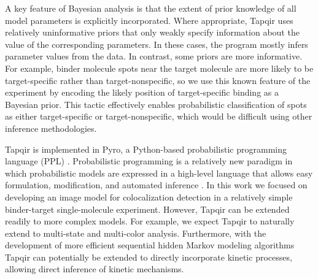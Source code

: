 A key feature of Bayesian analysis is that the extent of prior knowledge of all model parameters is explicitly incorporated. Where appropriate, Tapqir uses relatively uninformative priors that only weakly specify information about the value of the corresponding parameters.  In these cases, the program mostly infers parameter values from the data.  In contrast, some priors are more informative.  For example, binder molecule spots near the target molecule are more likely to be target-specific rather than target-nonspecific, so we use this known feature of the experiment by encoding the likely position of target-specific binding as a Bayesian prior. This tactic effectively enables probabilistic classification of spots as either target-specific or target-nonspecific, which would be difficult using other inference methodologies.

Tapqir is implemented in Pyro, a Python-based probabilistic programming language (PPL) \cite{Bingham2019-qy}. Probabilistic programming is a relatively new paradigm in which probabilistic models are expressed in a high-level language that allows easy formulation, modification, and automated inference \cite{Van_de_Meent2018-mi}. In this work we focused on developing an image model for colocalization detection in a relatively simple binder-target single-molecule experiment. However, Tapqir can be extended readily to more complex models. For example, we expect Tapqir to naturally extend to multi-state and multi-color analysis. Furthermore, with the development of more efficient sequential hidden Markov modeling algorithms \cite{Sarkka2019-jw,Obermeyer2019-pp} Tapqir can potentially be extended to directly incorporate kinetic processes, allowing direct inference of kinetic mechanisms.


